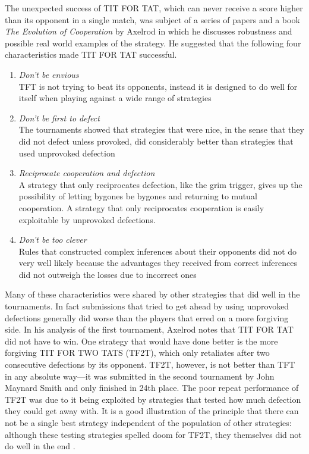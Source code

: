 The unexpected success of TIT FOR TAT, which can never receive a score higher than its opponent in a single match, was subject of a series of papers and a book \textit{The Evolution of Cooperation} by Axelrod in which he discusses robustness and possible real world examples of the strategy. He suggested that the following four characteristics made TIT FOR TAT successful.
\begin{enumerate}
\item \textit{Don't be envious} \\
TFT is not trying to beat its opponents, instead it is designed to do well for itself when playing against a wide range of strategies
\item \textit{Don't be first to defect} \\
The tournaments showed that strategies that were nice, in the sense that they did not defect unless provoked, did considerably better than strategies that used unprovoked defection
\item \textit{Reciprocate cooperation and defection} \\
A strategy that only reciprocates defection, like the grim trigger, gives up the possibility of letting bygones be bygones and returning to mutual cooperation. A strategy that only reciprocates cooperation is easily exploitable by unprovoked defections.
\item \textit{Don't be too clever} \\
Rules that constructed complex inferences about their opponents did not do very well likely because the advantages they received from correct inferences did not outweigh the losses due to incorrect ones
\end{enumerate}

Many of these characteristics were shared by other strategies that did well in the tournaments. In fact submissions that tried to get ahead by using unprovoked defections generally did worse than the players that erred on a more forgiving side. In his analysis of the first tournament, Axelrod notes that TIT FOR TAT did not have to win. One strategy that would have done better is the more forgiving TIT FOR TWO TATS (TF2T), which only retaliates after two consecutive defections by its opponent. TF2T, however, is not better than TFT in any absolute way---it was submitted in the second tournament by John Maynard Smith and only finished in 24th place. The poor repeat performance of TF2T was due to it being exploited by strategies that tested how much defection they could get away with. It is a good illustration of the principle that there can not be a single best strategy independent of the population of other strategies: although these testing strategies spelled doom for TF2T, they themselves did not do well in the end \cite[p.47]{axelrod1984evolution}.

